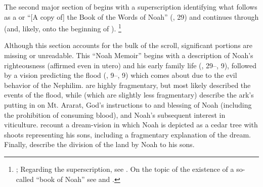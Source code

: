 The second major section of \ga begins with a superscription identifying what follows as a  or ``[A copy of] the Book of the Words of Noah'' (, 29) and continues through  (and, likely, onto the beginning of ).%
    \footnote{\Cite[174--175]{nickelsburg2005};
        Regarding the superscription, see \cite{steiner_dsd1995}.
        On the topic of the existence of a so-called ``book of Noah'' see 
        \cite{dimant_vanderkam-etal2006} and \cite{werman_chazon-etal1999}.}

Although this section accounts for the bulk of the scroll, significant portions are missing or unreadable. This ``Noah Memoir'' begins with a description of Noah's righteousness%
    \autocite{vanderkam_collins-nickelsburg1980}
(affirmed even in utero) and his early family life (, 29--, 9), followed by a vision predicting the flood (, 9--, 9) which comes about due to the evil behavior of the Nephilim.  are highly fragmentary, but most likely described the events of the flood, while  (which are slightly less fragmentary) describe the ark's putting in on Mt. Ararat, God's instructions to  and blessing of Noah (including the prohibition of consuming blood), and Noah's subsequent interest in viticulture.  recount a dream-vision in which Noah is depicted as a cedar tree with shoots representing his sons, including a fragmentary explanation of the dream. Finally,  describe the division of the land by Noah to his sons.

